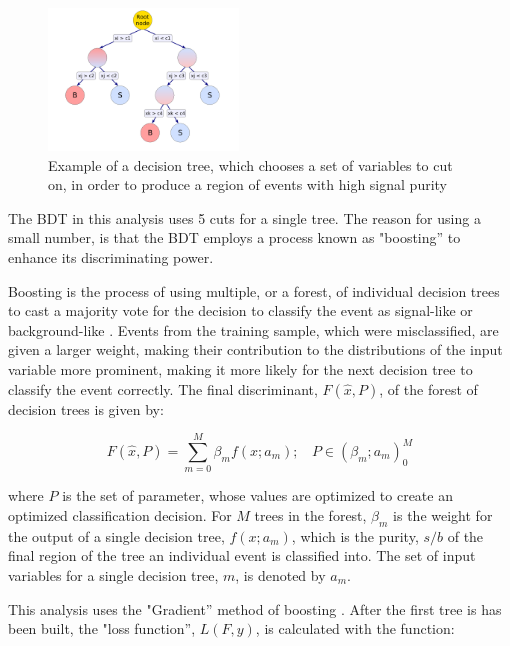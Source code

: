 \begin{figure}[hbtp]
\begin{center}
 \includegraphics[width=0.45\textwidth]{Figures/Analysis_2_Diagrams/BDT_example.pdf}
   \caption{Example of a decision tree, which chooses a set of
     variables to cut on, in order to produce a region of events with
     high signal purity }
   \label{fig:decision_tree}
 \end{center}
\end{figure}

\noindent  The BDT in this analysis uses 5 cuts for a single tree.
The reason for using a small number, is that the BDT employs a process
known as "boosting'' to enhance its discriminating power.  

\par Boosting is the process of using multiple, or a forest, of
individual decision trees to cast a majority vote for the decision to
classify the event as signal-like or background-like
\cite{Hocker:2007ht}.  Events from the training sample, which were
misclassified, are given a larger weight, making their contribution to
the distributions of the input variable more prominent, making it more
likely for the next decision tree to classify the event correctly.
The final discriminant, $F(\hat{x},P)$, of the forest of decision
trees is given by: 

\begin{equation}\label{eq:bdt_discriminant}
F(\hat{x}, P) = \sum_{m=0}^{M}\beta_{m}f(x;a_{m});
~~~~P\in(\beta_{m};a_{m})_{0}^{M}
\end{equation}

\noindent where $P$ is the set of parameter, whose values are
optimized to create an optimized classification decision.  For $M$
trees in the forest, $\beta_{m}$ is the weight for the output of a
single decision tree, $f(x;a_{m})$, which is the purity, $s/b$ of the
final region of the tree an individual event is classified into.  The
set of input variables for a single decision tree, $m$, is denoted by
$a_{m}$.   

\par This analysis uses the "Gradient'' method of boosting
\cite{Hocker:2007ht}.  After the first tree is has been built, the
"loss function'', $L(F,y)$, is calculated with the function:


